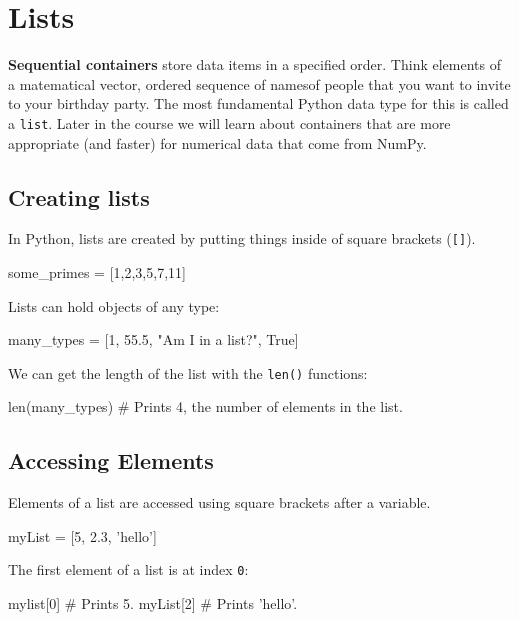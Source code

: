 \documentclass[12pt]{article} \newif\ifsolution\solutiontrue %
\begin{document}
\section{Lists}\label{lists}

\textbf{Sequential containers} store data items in a specified order.
Think elements of a matematical vector, ordered sequence of namesof people that you want to
invite to your birthday party. The most fundamental Python data type for
this is called a \texttt{list}. Later in the course we will learn about
containers that are more appropriate (and faster) for numerical data
that come from NumPy.

\subsection{Creating lists}\label{creating-lists}

In Python, lists are created by putting things inside of square brackets
(\texttt{{[}{]}}).

\begin{python}
some_primes = [1,2,3,5,7,11]
\end{python}

Lists can hold objects of any type:

\begin{python}
many_types = [1, 55.5, "Am I in a list?", True]
\end{python}

We can get the length of the list with the \texttt{len()} functions:

\begin{python}
len(many_types)  # Prints 4, the number of elements in the list.
\end{python}

\subsection{Accessing Elements}\label{accessing-elements}

Elements of a list are accessed using square brackets after a variable.

\begin{python}
myList = [5, 2.3, 'hello']
\end{python}

The first element of a list is at index \texttt{0}:

\begin{python}
mylist[0]  # Prints 5.
myList[2]  # Prints 'hello'.
\end{python}
\end{document}
